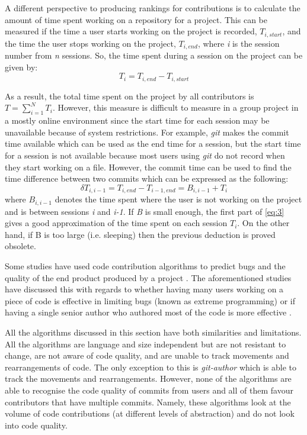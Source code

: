A different perspective to producing rankings for contributions is to calculate the amount of time spent working on a repository for a project. This can be measured if the time a user starts working on the project is recorded, \textit{$T_{i,start}$}, and the time the user stops working on the project, \textit{$T_{i,end}$}, where \textit{i} is the session number from \textit{n} sessions. So, the time spent during a session on the project can be given by:
\begin{equation}
    T_i = T_{i,end} - T_{i,start} 
\end{equation}

As a result, the total time spent on the project by all contributors is \textit{$T = \sum^{N}_{i=1} T_i$}. However, this measure is difficult to measure in a group project in a mostly online environment since the start time for each session may be unavailable because of system restrictions. For example, \textit{git} makes the commit time available which can be used as the end time for a session, but the start time for a session is not available because most users using \textit{git} do not record when they start working on a file. However, the commit time can be used to find the time difference between two commits which can be expressed as the following:
\begin{equation} \label{eq:3}
    \delta T_{i, i-1} = T_{i,end} - T_{i-1,end} = B_{i,i-1} + T_i
\end{equation}
where {$B_{i,i-1}$} denotes the time spent where the user is not working on the project and is between sessions \textit{i} and \textit{i-1}. If \textit{B} is small enough, the first part of \ref{eq:3} gives a good approximation of the time spent on each session $T_i$. On the other hand, if B is too large (i.e. sleeping) then the previous deduction is proved obsolete. 

Some studies have used code contribution algorithms to predict bugs and the quality of the end product produced by a project \citep{FOUCAULT2015102}. The aforementioned studies have discussed this with regards to whether having many users working on a piece of code is effective in limiting bugs (known as extreme programming) \citep{796139} or if having a single senior author who authored most of the code is more effective \citep{10.1145/2025113.2025119}. 

All the algorithms discussed in this section have both similarities and limitations. All the algorithms are language and size independent but are not resistant to change, are not aware of code quality, and are unable to track movements and rearrangements of code. The only exception to this is \textit{git-author} which is able to track the movements and rearrangements. However, none of the algorithms are able to recognise the code quality of commits from users and all of them favour contributors that have multiple commits. Namely, these algorithms look at the volume of code contributions (at different levels of abstraction) and do not look into code quality.
